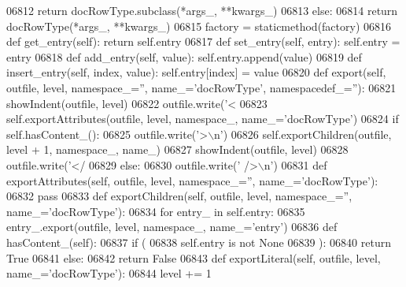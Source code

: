 \begin{DoxyCode}
{{{{{{{{{{{{{{{{{{{{{{{{{{{{{{{{{{{{{{{{{{{{{{{{{{{{{{{{{{{{{{{{{{{{{{{{{{{{{{{{{{{{{{{{{{{{{{{{{{{{{{{{{{{{{{{{{{{{{{{{{{{{{{{{{{{{{{{{{{{{{{{{{{{{{{{{{{{{{{{{{{{{{{{{{{{{{{{{{{{{{{{{{{{{{{{{{{{{{{{{{{{{{{{{{{{{{{{{{{{{{{{{{{{{{{{{{{{{{{{{{{{{{{{{{{{{{{{{{{{{{{{{{{{{{{{{{{{{{{{{{{{{{{{{{{{{{{{{{{{{{{{{{{{{{{{{{{{{{{{{{{{{{{{{{{{{{{{{{{{{{{{{{{{{{{{{{{{{{{{{{{{{{{{{{{{{{{{{{{{{{{{{{{{{{{{{{{{{{{{{{{{{{{{{{{{{{{{{{{{{{{06812             \textcolor{keywordflow}{return} docRowType.subclass(*args\_, **kwargs\_)
06813         \textcolor{keywordflow}{else}:
06814             \textcolor{keywordflow}{return} docRowType(*args\_, **kwargs\_)
06815     factory = staticmethod(factory)
06816     \textcolor{keyword}{def }get_entry(self): \textcolor{keywordflow}{return} self.entry
06817     \textcolor{keyword}{def }set_entry(self, entry): self.entry = entry
06818     \textcolor{keyword}{def }add_entry(self, value): self.entry.append(value)
06819     \textcolor{keyword}{def }insert_entry(self, index, value): self.entry[index] = value
06820     \textcolor{keyword}{def }export(self, outfile, level, namespace\_='', name\_='docRowType', namespacedef\_=''):
06821         showIndent(outfile, level)
06822         outfile.write(\textcolor{stringliteral}{'<%
06823         self.exportAttributes(outfile, level, namespace\_, name\_=\textcolor{stringliteral}{'docRowType'})
06824         \textcolor{keywordflow}{if} self.hasContent_():
06825             outfile.write(\textcolor{stringliteral}{'>\(\backslash\)n'})
06826             self.exportChildren(outfile, level + 1, namespace\_, name\_)
06827             showIndent(outfile, level)
06828             outfile.write(\textcolor{stringliteral}{'</%
06829         \textcolor{keywordflow}{else}:
06830             outfile.write(\textcolor{stringliteral}{' />\(\backslash\)n'})
06831     \textcolor{keyword}{def }exportAttributes(self, outfile, level, namespace\_='', name\_='docRowType'):
06832         \textcolor{keywordflow}{pass}
06833     \textcolor{keyword}{def }exportChildren(self, outfile, level, namespace\_='', name\_='docRowType'):
06834         \textcolor{keywordflow}{for} entry\_ \textcolor{keywordflow}{in} self.entry:
06835             entry\_.export(outfile, level, namespace\_, name\_=\textcolor{stringliteral}{'entry'})
06836     \textcolor{keyword}{def }hasContent_(self):
06837         \textcolor{keywordflow}{if} (
06838             self.entry \textcolor{keywordflow}{is} \textcolor{keywordflow}{not} \textcolor{keywordtype}{None}
06839             ):
06840             \textcolor{keywordflow}{return} \textcolor{keyword}{True}
06841         \textcolor{keywordflow}{else}:
06842             \textcolor{keywordflow}{return} \textcolor{keyword}{False}
06843     \textcolor{keyword}{def }exportLiteral(self, outfile, level, name\_='docRowType'):
06844         level += 1
}}}}}}}}}}}}}}}}}}}}}}}}}}}}}}}}}}}}}}}}}}}}}}}}}}}}}}}}}}}}}}}}}}}}}}}}}}}}}}}}}}}}}}}}}}}}}}}}}}}}}}}}}}}}}}}}}}}}}}}}}}}}}}}}}}}}}}}}}}}}}}}}}}}}}}}}}}}}}}}}}}}}}}}}}}}}}}}}}}}}}}}}}}}}}}}}}}}}}}}}}}}}}}}}}}}}}}}}}}}}}}}}}}}}}}}}}}}}}}}}}}}}}}}}}}}}}}}}}}}}}}}}}}}}}}}}}}}}}}}}}}}}}}}}}}}}}}}}}}}}}}}}}}}}}}}}}}}}}}}}}}}}}}}}}}}}}}}}}}}}}}}}}}}}}}}}}}}}}}}}}}}}}}}}}}}}}}}}}}}}}}}}}}}}}}}}}}}}}}}}}}}}}}}}}}}}}}}}}}}}}}}}
\end{DoxyCode}
